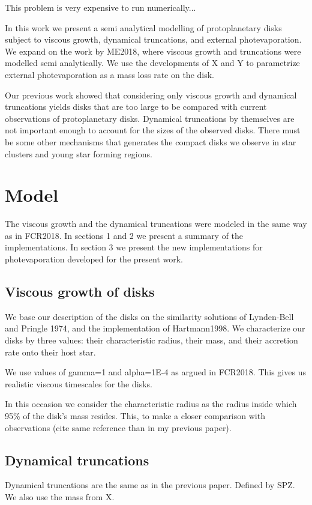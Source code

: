 \documentclass[fleqn,usenatbib]{mnras}
\begin{document}
This problem is very expensive to run numerically...

In this work we present a semi analytical modelling of protoplanetary disks subject to viscous growth, dynamical truncations, and external photevaporation. We expand on the work by ME2018, where viscous growth and truncations were modelled semi analytically. We use the developments of X and Y to parametrize external photevaporation as a mass loss rate on the disk.

Our previous work showed that considering only viscous growth and dynamical truncations yields disks that are too large to be compared with current observations of protoplanetary disks. Dynamical truncations by themselves are not important enough to account for the sizes of the observed disks. There must be some other mechanisms that generates the compact disks we observe in star clusters and young star forming regions.


\section{Model}
\label{sec:model}

The viscous growth and the dynamical truncations were modeled in the same way as in FCR2018. In sections 1 and 2 we present a summary of the implementations. In section 3 we present the new implementations for photevaporation developed for the present work.

\subsection{Viscous growth of disks}

We base our description of the disks on the similarity solutions of Lynden-Bell and Pringle 1974, and the implementation of Hartmann1998. We characterize our disks by three values: their characteristic radius, their mass, and their accretion rate onto their host star.

We use values of gamma=1 and alpha=1E-4 as argued in FCR2018. This gives us realistic viscous timescales for the disks.

In this occasion we consider the characteristic radius as the radius inside which 95\% of the disk's mass resides. This, to make a closer comparison with observations (cite same reference than in my previous paper).

\subsection{Dynamical truncations}
Dynamical truncations are the same as in the previous paper. Defined by SPZ. We also use the mass from X.
\end{document}
